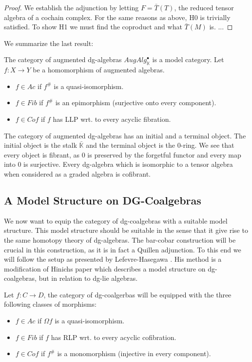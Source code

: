 \documentclass[../thesis.tex]{subfiles}
\begin{document}
            \begin{proof}
                We establish the adjunction by letting $F = \bar{T} (T)$, the reduced tensor algebra of a cochain complex. For the same reasons as above, H0 is trivially satisfied. To show H1 we must find the coproduct and what $\bar{T}(M)$ is. ...
            \end{proof}

            We summarize the last result:

            The category of augmented dg-algebras $AugAlg^\bullet_\mathbb{K}$ is a model category. Let $f:X\rightarrow Y$ be a homomorphism of augmented algebras. 
            \begin{itemize}
                \item $f\in Ac$ if $f^\#$ is a quasi-isomorphism.
                \item $f\in Fib$ if $f^\#$ is an epimorphism (surjective onto every component).
                \item $f\in Cof$ if $f$ has LLP wrt. to every acyclic fibration.
            \end{itemize}
            
            The category of augmented dg-algebras has an initial and a terminal object. The initial object is the stalk $\bar{\mathbb{K}}$ and the terminal object is the $0$-ring. We see that every object is fibrant, as $0$ is preserved by the forgetful functor and every map into $0$ is surjective. Every dg-algebra which is isomorphic to a tensor algebra when considered as a graded algebra is cofibrant.
            
    \subsection{A Model Structure on DG-Coalgebras}

            We now want to equip the category of dg-coalgebras with a suitable model structure. This model structure should be suitable in the sense that it give rise to the same homotopy theory of dg-algebras. The bar-cobar construction will be crucial in this construction, as it is in fact a Quillen adjunction. To this end we will follow the setup as presented by Lefevre-Hasegawa \cite{LefevreHasegawa03}. His method is a modification of Hinichs paper \cite{Hinich01} which describes a model structure on dg-coalgebras, but in relation to dg-lie algebras.

            Let $f: C \rightarrow D$, the category of dg-coalgerbas will be equipped with the three following classes of morphisms:
            \begin{itemize}
                \item $f\in Ac$ if $\Omega f$ is a quasi-isomorphism.
                \item $f\in Fib$ if $f$ has RLP wrt. to every acyclic cofibration.
                \item $f\in Cof$ if $f^\#$ is a monomorphism (injective in every component).
            \end{itemize}
\end{document}
